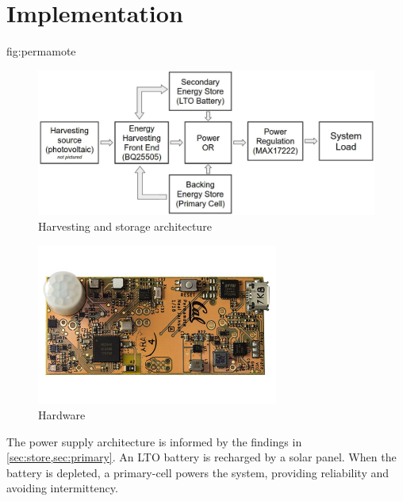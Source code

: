 \section{\name Implementation}
\label{sec:impl:permamote}



\begin{definefigure}{fig:permamote}
    \centering
    \begin{subfigure}{0.7\columnwidth}
        \centering
        \includegraphics[width=\textwidth]{figs/capacity/arch}
        \caption{Harvesting and storage architecture}
    \end{subfigure}
    \begin{subfigure}{0.29\columnwidth}
        \centering
        \includegraphics[width=\textwidth,angle=90]{figs/capacity/permamote}
        \caption{Hardware}
    \end{subfigure}
    \caption{\normalfont The \name power supply architecture is informed by the
    findings in \cref{sec:store,sec:primary}. An
    LTO battery is recharged by a solar panel. When the battery is depleted,
    a primary-cell powers the system, providing reliability and avoiding
    intermittency.
    }
\end{definefigure}

